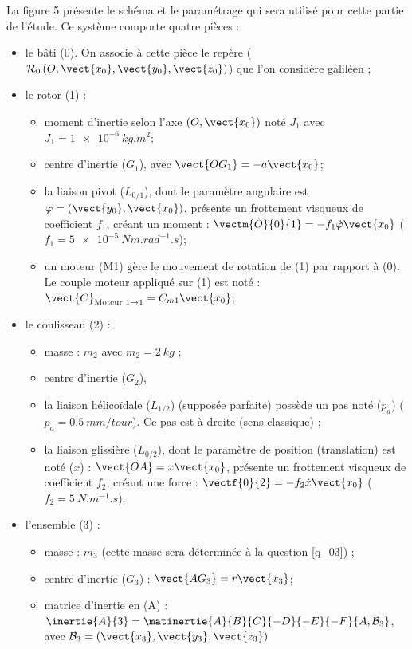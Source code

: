 La figure 5 présente le schéma et le paramétrage qui sera utilisé pour cette partie de l’étude. Ce système
comporte quatre pièces :
\begin{itemize}
\item le bâti (0). On associe à cette pièce le repère ($\mathcal{R}_0\left(O, \vect{x_0}, \vect{y_0}, \vect{z_0}\right)$) que l’on considère galiléen ;
\item le rotor (1) :
\begin{itemize}
\item moment d’inertie selon l’axe $\left(O,\vect{x_0}\right)$  noté $J_1$ avec $J_1 = \SI{1e-6}{kg.m^2}$;
\item centre d’inertie ($G_1$), avec $\vect{OG_1} = -a\vect{x_0}$;
\item la liaison pivot ($L_{0/1}$), dont le paramètre angulaire est $\varphi = \left(\vect{y_0},\vect{x_0}\right)$, présente un frottement visqueux de coefficient $f_1$, créant un moment : $\vectm{O}{0}{1} = -f_1 \dot{\varphi} \vect{x_0}$ ($f_1 = \SI{5e-5}{Nm.rad^{-1}.s}$);
\item un moteur (M1) gère le mouvement de rotation de (1) par rapport à (0). Le couple moteur
appliqué sur (1) est noté : $\vect{C}_{\text{Moteur 1}\rightarrow 1}=C_{m1}\vect{x_0}$;
\end{itemize}
\item le coulisseau (2) :
\begin{itemize}
\item masse : $m_2$ avec $m_2 = \SI{2}{kg}$ ;
\item centre d’inertie ($G_2$),
\item la liaison hélicoïdale ($L_{1/2}$) (supposée parfaite) possède un pas noté ($p_a$) ($p_a = \SI{0,5}{mm/tour}$).
Ce pas est à droite (sens classique) ;
\item la liaison glissière ($L_{0/2}$), dont le paramètre de position (translation) est noté ($x$) : $\vect{OA} = x\vect{x_0}$, présente un frottement visqueux de coefficient $f_2$, créant une force : $\vectf{0}{2}=-f_2 \dot{x}\vect{x_0}$ ($f_2 = \SI{5}{N.m^{-1}.s}$);
\end{itemize}
\item l’ensemble (3) :
\begin{itemize}
\item masse : $m_3$ (cette masse sera déterminée à la question \ref{q_03}) ;
\item centre d’inertie ($G_3$) : $\vect{AG_3}=r\vect{x_3}$;
\item matrice d’inertie en (A) : $\inertie{A}{3} = \matinertie{A}{B}{C}{-D}{-E}{-F}{A,\mathcal{B}_3}$, avec $\mathcal{B}_3=\left(\vect{x_3},\vect{y_3},\vect{z_3}\right)$

\end{itemize}
\end{itemize}
